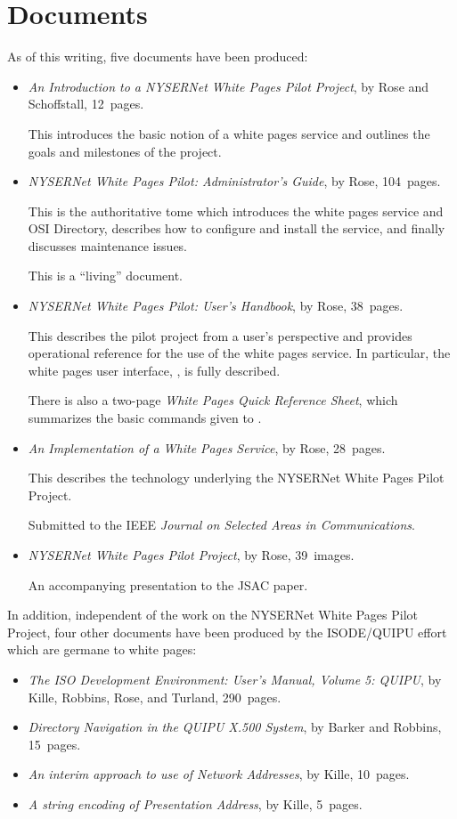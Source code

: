 \section	{Documents}
As of this writing,
five documents have been produced:
\begin{itemize}
\item	{\em An Introduction to a NYSERNet White Pages Pilot Project},
	by Rose and Schoffstall,
	12~pages.

This introduces the basic notion of a white pages service and outlines
the goals and milestones of the project.

\item	{\em NYSERNet White Pages Pilot: Administrator's Guide},
	by Rose,
	104~pages.

This is the authoritative tome which introduces the white pages service and
OSI Directory,
describes how to configure and install the service,
and finally discusses maintenance issues.

This is a ``living'' document.

\item	{\em NYSERNet White Pages Pilot: User's Handbook},
	by Rose,
	38~pages.

This describes the pilot project from a user's perspective
and provides operational reference for the use of the white pages service.
In particular,
the white pages user interface, , is fully described.

There is also a two-page {\em White Pages Quick Reference Sheet},
which summarizes the basic commands given to .

\item	{\em An Implementation of a White Pages Service},
	by Rose,
	28~pages.

This describes the technology underlying the NYSERNet White Pages Pilot
Project.

Submitted to the IEEE {\em Journal on Selected Areas in Communications}.

\item	{\em NYSERNet White Pages Pilot Project},
	by Rose,
	39~images.

An accompanying presentation to the JSAC paper.
\end{itemize}
In addition,
independent of the work on the NYSERNet White Pages Pilot Project,
four other documents have been produced by the ISODE/QUIPU effort which
are germane to white pages:
\begin{itemize}
\item	{\em The ISO Development Environment: User's Manual, Volume 5: QUIPU},
	by Kille, Robbins, Rose, and Turland,
	290~pages.

\item	{\em Directory Navigation in the QUIPU X.500 System},
	by Barker and Robbins,
	15~pages.

\item	{\em An interim approach to use of Network Addresses},
	by Kille,
	10~pages.

\item	{\em A string encoding of Presentation Address},
	by Kille,
	5~pages.
\end{itemize}

